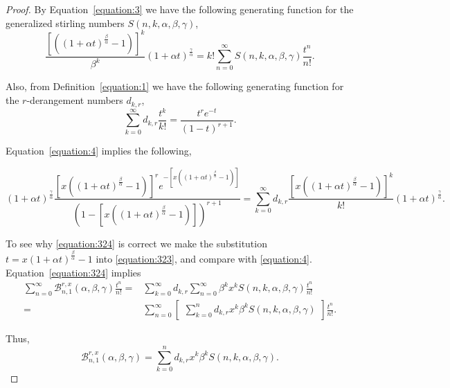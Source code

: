 \documentclass[10pt,a4paper]{amsart}
\begin{document}
\begin{proof} By Equation~\eqref{equation:3} we have the following generating function for the generalized stirling numbers $S(n,k,\alpha,\beta,\gamma)$, \begin{equation}\label{equation:322}
		\frac{[((1+\alpha t)^\frac{\beta}{\alpha}-1)]^k}{\beta^k}(1+\alpha t)^{\frac{\gamma}{\alpha}}=k!\sum\limits_{n=0}^{\infty}S(n,k,\alpha,\beta,\gamma)\frac{t^n}{n!}.
	\end{equation}
	
	Also, from Definition~\ref{equation:1} we have the following generating function for the $r$-derangement numbers $d_{k,r}$, 
		\begin{equation}\label{equation:323}
		\sum_{k=0}^{\infty}d_{k,r}\frac{t^k}{k!}=\frac{t^re^{-t}}{(1-t)^{r+1}}.
	\end{equation}
	
	
	
	Equation~\eqref{equation:4} implies the following,
	
	
	\begin{equation}\label{equation:324}(1+\alpha t)^{\frac{\gamma}{\alpha}}\frac{[x((1+\alpha t)^\frac{\beta}{\alpha}-1)]^re^{-[x((1+\alpha t)^\frac{\beta}{\alpha}-1)]}}{(1-[x((1+\alpha t)^\frac{\beta}{\alpha}-1)])^{r+1}}=\sum\limits_{k=0}^{\infty}d_{k,r}\frac{[x((1+\alpha t)^\frac{\beta}{\alpha}-1)]^k}{k!}(1+\alpha t)^{\frac{\gamma}{\alpha}}. \end{equation}
	
	
	To see why \eqref{equation:324} is correct we make the substitution $t=x(1+\alpha t)^\frac{\beta}{\alpha}-1$ into \eqref{equation:323}, and compare with \eqref{equation:4}. Equation~\ref{equation:324} implies 
	\begin{align*}
		\sum\limits_{n=0}^\infty	\mathcal{B}^{r,x}_{n,1}(\alpha,\beta,\gamma)\frac{t^n}{n!}=&\sum\limits_{k=0}^{\infty}d_{k,r}\sum\limits_{n=0}^{\infty}\beta^{k}x^{k}S(n,k,\alpha,\beta,\gamma)\frac{t^n}{n!}\\=&\sum\limits_{n=0}^{\infty}\begin{bmatrix}\sum\limits_{k=0}^nd_{k,r}x^{k}\beta^{k}S(n,k,\alpha,\beta,\gamma)\end{bmatrix}\frac{t^n}{n!}.
	\end{align*}
	
	Thus, 
		\begin{equation}
		\mathcal{B}^{r,x}_{n,1}(\alpha,\beta,\gamma)=\sum_{k=0}^{n}d_{k,r}x^{k}\beta^{k} S(n,k,\alpha,\beta,\gamma).
	\end{equation}
	
\end{proof}
\end{document}
